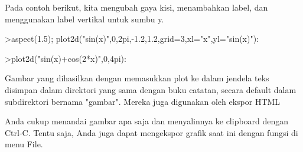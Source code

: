 \documentclass{article}
\begin{document}
\begin{eulernotebook}
\begin{eulercomment}
\begin{eulercomment}
\begin{eulercomment}
\begin{eulercomment}
\begin{eulercomment}
\begin{eulercomment}
\begin{eulercomment}
Pada  contoh  berikut,  kita  mengubah  gaya  kisi,  menambahkan
label, dan  menggunakan  label  vertikal  untuk sumbu y.
\end{eulercomment}
\begin{eulerprompt}
>aspect(1.5); plot2d("sin(x)",0,2pi,-1.2,1.2,grid=3,xl="x",yl="sin(x)"):
\end{eulerprompt}
\begin{eulerprompt}
>plot2d("sin(x)+cos(2*x)",0,4pi):
\end{eulerprompt}
\begin{eulercomment}
Gambar  yang  dihasilkan  dengan  memasukkan  plot  ke  dalam  jendela
teks  disimpan  dalam  direktori  yang  sama  dengan  buku catatan,
secara  default  dalam  subdirektori  bernama  "gambar". Mereka juga
digunakan  oleh  ekspor  HTML

Anda  cukup  menandai  gambar  apa  saja  dan  menyalinnya  ke
clipboard dengan  Ctrl-C. Tentu  saja,  Anda  juga  dapat  mengekspor
grafik  saat ini  dengan  fungsi  di  menu  File.


\end{eulercomment}
\end{eulercomment}
\end{eulercomment}
\end{eulercomment}
\end{eulercomment}
\end{eulercomment}
\end{eulercomment}
\end{eulernotebook}
\end{document}
